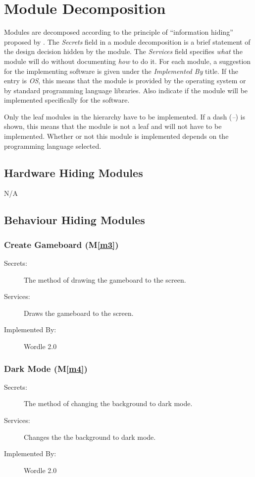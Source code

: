 \documentclass[12pt, titlepage]{article}
\newcommand{\mref}[1]{M\ref{#1}}
\begin{document}
	\section{Module Decomposition} \label{SecMD}
	
	Modules are decomposed according to the principle of ``information hiding''
	proposed by \citet{ParnasEtAl1984}. The \emph{Secrets} field in a module
	decomposition is a brief statement of the design decision hidden by the
	module. The \emph{Services} field specifies \emph{what} the module will do
	without documenting \emph{how} to do it. For each module, a suggestion for the
	implementing software is given under the \emph{Implemented By} title. If the
	entry is \emph{OS}, this means that the module is provided by the operating
	system or by standard programming language libraries.  Also indicate if the
	module will be implemented specifically for the software.
	
	Only the leaf modules in the
	hierarchy have to be implemented. If a dash (\emph{--}) is shown, this means
	that the module is not a leaf and will not have to be implemented. Whether or
	not this module is implemented depends on the programming language
	selected.
	
	\subsection{Hardware Hiding Modules}
	N/A
	
	\subsection{Behaviour Hiding Modules}
	
	\subsubsection{Create Gameboard (\mref{m3})}
	
	\begin{description}
		\item[Secrets:]The method of drawing the gameboard to the screen.
		\item[Services:]Draws the gameboard to the screen.
		\item[Implemented By:] Wordle 2.0
	\end{description}
	
	\subsubsection{Dark Mode (\mref{m4})}
	\begin{description}
		\item[Secrets:]The method of changing the background to dark mode.
		\item[Services:]Changes the the background to dark mode.
		\item[Implemented By:] Wordle 2.0
	\end{description}
	
\end{document}
